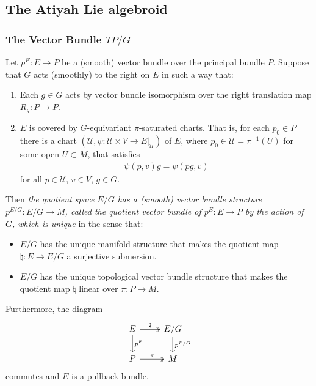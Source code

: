 \subsection{The Atiyah Lie algebroid}

\subsubsection{The Vector Bundle $TP/G$}

\begin{proposition} \label{3.1.1}
Let $p^E: E \to P$ be a (smooth) vector bundle over the principal bundle $P$. Suppose that $G$ acts (smoothly) to the right on $E$ in such a way that:
\begin{enumerate}
    \item Each $g \in G$ acts by vector bundle isomorphism over the right translation map $R_g: P \to P$.
    
    \item $E$ is covered by $G$-equivariant $\pi$-saturated charts. That is, for each $p_0 \in P$ there is a chart $(\mathcal U, \psi: \mathcal U \times V \to E|_{\mathcal U})$ of $E$, where $p_0 \in \mathcal U = \pi^{-1}(U)$ for some open $U \subset M$, that satisfies 
    \begin{align*}
        \psi(p, v)g = \psi(pg, v)
    \end{align*}
    for all $p \in \mathcal U$, $v \in V$, $g \in G$.
\end{enumerate}
Then \emph{the quotient space $E/G$ has a (smooth) vector bundle structure $p^{E/G}: E/G \to M$, called \emph{the quotient vector bundle of $p^E: E \to P$ by the action of $G$}, which is unique} in the sense that:
\begin{itemize}
    \item $E/G$ has the unique manifold structure that makes the quotient map $\natural: E \to E/G$ a surjective submersion.
    \item $E/G$ has the unique topological vector bundle structure that makes the quotient map $\natural$ linear over $\pi: P \to M$.
\end{itemize}
Furthermore, the diagram
\begin{equation} \label{pullbackQuotient}
\begin{tikzcd}
    E \arrow[two heads]{r}{\natural} \arrow{d}{p^E} & E/G \arrow{d}{p^{E/G}} \\
    P \arrow[two heads]{r}{\pi}                     & M
\end{tikzcd}
\end{equation}
commutes and $E$ is a pullback bundle.


\end{proposition}
